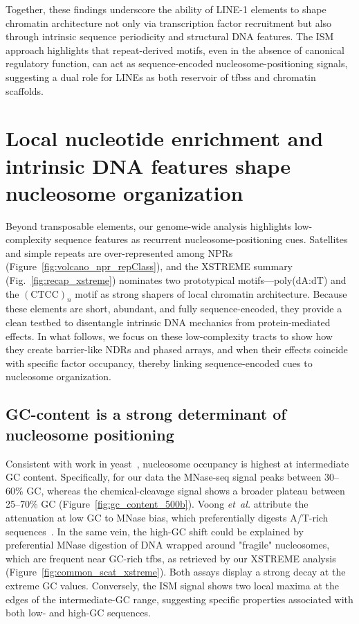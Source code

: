 \documentclass[11pt]{book}
\begin{document}
Together, these findings underscore the ability of LINE-1 elements to shape chromatin architecture not only via transcription factor recruitment but also through intrinsic sequence periodicity and structural DNA features. The ISM approach highlights that repeat-derived motifs, even in the absence of canonical regulatory function, can act as sequence-encoded nucleosome-positioning signals, suggesting a dual role for LINEs as both reservoir of \glspl{tfbs} and chromatin scaffolds.

\FloatBarrier
\section{Local nucleotide enrichment and intrinsic DNA features shape nucleosome organization}
Beyond transposable elements, our genome-wide analysis highlights low-complexity sequence features as recurrent nucleosome-positioning cues. Satellites and simple repeats are over-represented among NPRs (Figure~\ref{fig:volcano_npr_repClass}), and the XSTREME summary (Fig.~\ref{fig:recap_xstreme}) nominates two prototypical motifs—poly(dA{:}dT) and the $(\mathrm{CTCC})_n$ motif as strong shapers of local chromatin architecture. Because these elements are short, abundant, and fully sequence-encoded, they provide a clean testbed to disentangle intrinsic DNA mechanics from protein-mediated effects. In what follows, we focus on these low-complexity tracts to show how they create barrier-like NDRs and phased arrays, and when their effects coincide with specific factor occupancy, thereby linking sequence-encoded cues to nucleosome organization.

\subsection{GC-content is a strong determinant of nucleosome positioning}
Consistent with work in yeast~\cite{meneu_sequence-dependent_2025}, nucleosome occupancy is highest at intermediate GC content. Specifically, for our data the MNase-seq signal peaks between 30–60\% GC, whereas the chemical-cleavage signal shows a broader plateau between 25–70\% GC (Figure~\ref{fig:gc_content_500b}). Voong \emph{et~al.} attribute the attenuation at low GC to MNase bias, which preferentially digests A/T-rich sequences~\cite{voong_genome-wide_2017}. In the same vein, the high-GC shift could be explained by preferential MNase digestion of DNA wrapped around "fragile" nucleosomes, which are frequent near GC-rich \gls{tfbs}, as retrieved by our XSTREME analysis (Figure~\ref{fig:common_scat_xstreme}).
Both assays display a strong decay at the extreme GC values. Conversely, the ISM signal shows two local maxima at the edges of the intermediate-GC range, suggesting specific properties associated with both low- and high-GC sequences.
\end{document}
